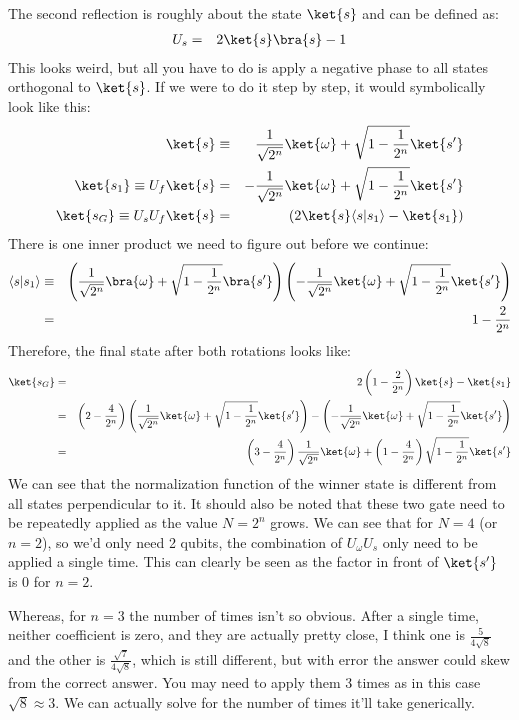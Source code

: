 \documentclass[preprint,aps,prd,nofootinbib,superscriptaddress]{revtex4-2}
\newcommand{\BraKet}[2]{\langle #1 | #2 \rangle}
\begin{document}
%
The second reflection is roughly about the state $\ket{s}$ and can be defined as:
%
\begin{eqnarray}
U_s &=& 2\ket{s}\bra{s} - 1
\end{eqnarray}
%
This looks weird, but all you have to do is apply a negative phase to all states orthogonal to $\ket{s}$. If we were to do it step by step, it would symbolically look like this:
%
\begin{eqnarray}
\ket{s} &\equiv & 
\frac{1}{\sqrt{2^n}} \ket{\omega} 
+ \sqrt{1-\frac{1}{2^n}} \ket{s^\prime}
\nonumber \\
\ket{s_1} \equiv U_f \ket{s} &=& 
- \frac{1}{\sqrt{2^n}} \ket{\omega} 
+ \sqrt{1-\frac{1}{2^n}} \ket{s^\prime}
\nonumber \\
\ket{s_G} \equiv U_s U_f \ket{s} &=& (2\ket{s}\BraKet{s}{s_1} - \ket{s_1})
\end{eqnarray}
%
There is one inner product we need to figure out before we continue:
%
\begin{eqnarray}
\BraKet{s}{s_1} &\equiv & 
\left(\frac{1}{\sqrt{2^n}} \bra{\omega} 
+ \sqrt{1-\frac{1}{2^n}} \bra{s^\prime} \right) 
\left(- \frac{1}{\sqrt{2^n}} \ket{\omega} 
+ \sqrt{1-\frac{1}{2^n}} \ket{s^\prime} \right)
\nonumber \\
&=& 1 - \frac{2}{2^n}
\end{eqnarray}
%
Therefore, the final state after both rotations looks like:
%
\begin{eqnarray}
\ket{s_G} &=& 2\left(1 - \frac{2}{2^n}\right)\ket{s} - \ket{s_1}
\nonumber \\
&=& \left(2 - \frac{4}{2^n}\right)\left(\frac{1}{\sqrt{2^n}} \ket{\omega} 
+ \sqrt{1-\frac{1}{2^n}} \ket{s^\prime} \right) - \left(- \frac{1}{\sqrt{2^n}} \ket{\omega} 
+ \sqrt{1-\frac{1}{2^n}} \ket{s^\prime} \right)
\nonumber \\
&=& \left(3 - \frac{4}{2^n}\right)\frac{1}{\sqrt{2^n}} \ket{\omega} 
+ \left(1 - \frac{4}{2^n}\right) \sqrt{1-\frac{1}{2^n}} \ket{s^\prime}
\end{eqnarray}
%
We can see that the normalization function of the winner state is different from all states perpendicular to it. It should also be noted that these two gate need to be repeatedly applied as the value $N = 2^n$ grows. We can see that for $N=4$ (or $n=2$), so we'd only need 2 qubits, the combination of $U_\omega U_s$ only need to be applied a single time. This can clearly be seen as the factor in front of $\ket{s^\prime}$ is 0 for $n=2$. 
%

%
Whereas, for $n=3$ the number of times isn't so obvious. After a single time, neither coefficient is zero, and they are actually pretty close, I think one is $\frac{5}{4\sqrt{8}}$ and the other is $\frac{\sqrt{7}}{4\sqrt{8}}$, which is still different, but with error the answer could skew from the correct answer. You may need to apply them 3 times as in this case $\sqrt{8}\approx 3$. We can actually solve for the number of times it'll take generically.
%
\end{document}
